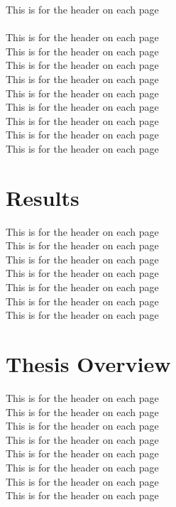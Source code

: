 This is for the header on each page\\
\\
This is for the header on each page\\
This is for the header on each page\\
This is for the header on each page\\
This is for the header on each page\\
This is for the header on each page\\
This is for the header on each page\\
This is for the header on each page\\
This is for the header on each page\\
This is for the header on each page




\section{Results}



This is for the header on each page\\
This is for the header on each page\\
This is for the header on each page\\
This is for the header on each page\\
This is for the header on each page\\
This is for the header on each page\\
This is for the header on each page\\


\section{Thesis Overview}

This is for the header on each page\\
This is for the header on each page\\
This is for the header on each page\\
This is for the header on each page\\
This is for the header on each page\\
This is for the header on each page\\
This is for the header on each page\\
This is for the header on each page\\
